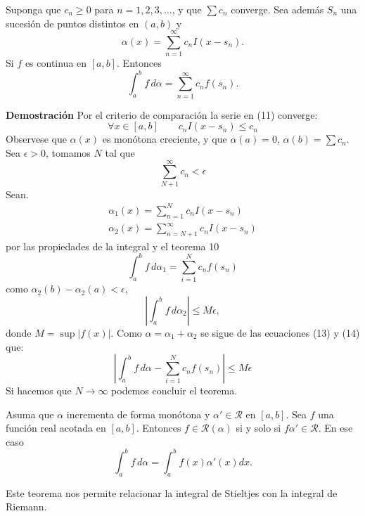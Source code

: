 \documentclass[10pt]{beamer}
\begin{document}
\begin{frame}[allowframebreaks]

\begin{theorem}[11]
Suponga que $c_n \geq 0$ para $n = 1, 2, 3, \dots$, y que $\sum c_n$ converge. Sea además ${S_n}$ una sucesión de puntos distintos en $(a, b)$ y
\begin{equation}
	\alpha(x) = \sum_{n=1}^{\infty} c_n I(x-s_n).
\end{equation}
Si $f$ es continua en $[a, b]$. Entonces
\begin{equation}
	\int_a^b f\,d\alpha = \sum_{n=1}^{\infty} c_n f(s_n).
\end{equation}
\end{theorem}

\textbf{Demostración}
Por el criterio de comparación la serie en (11) converge:
\[
	\forall x \in [a, b] \qquad c_n I(x-s_n) \leq c_n
\]
Observese que $\alpha(x)$ es monótona creciente, y que $\alpha(a)=0$, $\alpha(b)=\sum c_n$.
Sea $\epsilon>0$, tomamos $N$ tal que
\[
	\sum_{N+1}^\infty c_n < \epsilon
\]
Sean.
\[
	\begin{array}{c}
		\alpha_1(x) = \sum_{n=1}^N c_n I(x-s_n) \\
		\alpha_2(x) = \sum_{n=N+1}^\infty c_n I(x-s_n)
	\end{array}
\]
por las propiedades de la integral y el teorema 10
\begin{equation}
	\int_a^b f\,d\alpha_1 = \sum_{i=1}^N c_n f(s_n)
\end{equation}
como $\alpha_2(b)-\alpha_2(a)<\epsilon$,
\begin{equation}
	\left|\int_a^b f\,d\alpha_2\right| \leq M\epsilon,
\end{equation}
donde $M = \sup|f(x)|$. Como $\alpha = \alpha_1 + \alpha_2$ se sigue de las ecuaciones (13) y (14) que:
\[
	\left|\int_a^b f\,d\alpha - \sum_{i=1}^N c_n f(s_n) \right| \leq M\epsilon
\]
Si hacemos que $N \rightarrow \infty$ podemos concluir el teorema.
\end{frame}

\begin{frame}
\begin{theorem}[12]
Asuma que $\alpha$ incrementa de forma monótona  y $\alpha' \in \mathcal{R}$ en $[a, b]$. Sea $f$ una función real acotada en $[a, b]$.
Entonces $f \in \mathcal{R}(\alpha)$ si y solo si $f\alpha' \in \mathcal{R}$. En ese caso
\begin{equation}
	\int_a^b f\,d\alpha = \int_a^b f(x)\alpha'(x) dx.
\end{equation}
\end{theorem}

Este teorema nos permite relacionar la integral de Stieltjes con la integral de Riemann.
\end{frame}
\end{document}
